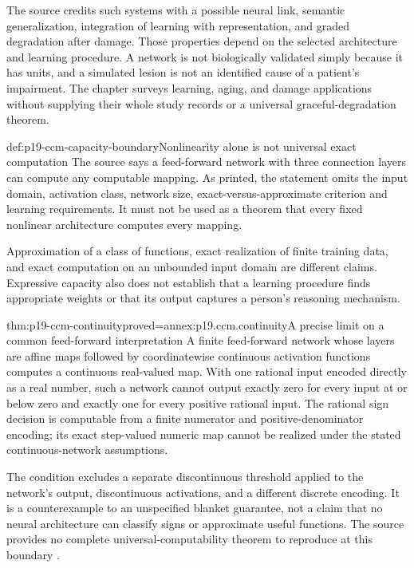 The source credits such systems with a possible neural link, semantic
generalization, integration of learning with representation, and graded
degradation after damage. Those properties depend on the selected
architecture and learning procedure. A network is not biologically
validated simply because it has units, and a simulated lesion is not
an identified cause of a patient's impairment. The chapter surveys
learning, aging, and damage applications without supplying their whole
study records or a universal graceful-degradation theorem.

\begin{hbwarning}{def:p19-ccm-capacity-boundary}{Nonlinearity alone is not universal exact computation}
The source says a feed-forward network with three connection layers
can compute any computable mapping. As printed, the statement omits
the input domain, activation class, network size, exact-versus-approximate
criterion and learning requirements. It must not be used as a theorem
that every fixed nonlinear architecture computes every mapping.

Approximation of a class of functions, exact realization of finite
training data, and exact computation on an unbounded input domain are
different claims. Expressive capacity also does not establish that a
learning procedure finds appropriate weights or that its output captures
a person's reasoning mechanism.
\end{hbwarning}

\begin{hbtheorem}{thm:p19-ccm-continuity}{proved=annex:p19.ccm.continuity}{A precise limit on a common feed-forward interpretation}
A finite feed-forward network whose layers are affine maps followed
by coordinatewise continuous activation functions computes a continuous
real-valued map. With one rational input encoded directly as a real
number, such a network cannot output exactly zero for every input at
or below zero and exactly one for every positive rational input.
The rational sign decision is computable from a finite numerator and
positive-denominator encoding; its exact step-valued numeric map cannot
be realized under the stated continuous-network assumptions.
\end{hbtheorem}

The condition excludes a separate discontinuous threshold applied to
the network's output, discontinuous activations, and a different
discrete encoding. It is a counterexample to an unspecified blanket
guarantee, not a claim that no neural architecture can classify signs
or approximate useful functions. The source provides no complete
universal-computability theorem to reproduce at this boundary
\parencite[pp.~57--58]{DoumasHummel2012HigherCognition}.

